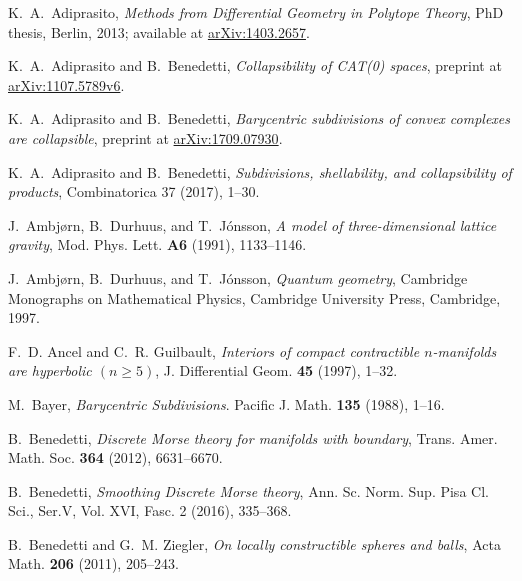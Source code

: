 \documentclass[a4paper,11pt]{article}
\theoremstyle{plain}
\theoremstyle{definition}
\begin{document}
{\small
\begin{thebibliography}{AL{\L}M13}

K.~A.~Adiprasito, \emph{Methods from Differential Geometry in Polytope Theory}, PhD thesis, Berlin, 2013; available at 
\url{arXiv:1403.2657}.

K.~A.~Adiprasito and B.~Benedetti, \emph{Collapsibility of CAT(0) spaces}, preprint at \url{arXiv:1107.5789v6}.

K.~A.~Adiprasito and B.~Benedetti, \emph{Barycentric subdivisions of convex complexes are collapsible}, preprint at \url{arXiv:1709.07930}.

K.~A.~Adiprasito and B.~Benedetti, \emph{Subdivisions, shellability, and collapsibility of products}, Combinatorica 37 (2017), 1--30.


J.~Ambj{\o}rn, B.~Durhuus, and T.~J{\'o}nsson, \emph{A model of three-dimensional lattice gravity},
Mod. Phys. Lett.  \textbf{A6} (1991), 1133--1146.

J.~Ambj{\o}rn, B.~Durhuus, and T.~J{\'o}nsson, \emph{Quantum geometry},
  Cambridge Monographs on Mathematical Physics, Cambridge University Press,
  Cambridge, 1997.


F.~D. Ancel and C.~R. Guilbault, \emph{Interiors of compact contractible {$n$}-manifolds are hyperbolic
  {$(n\geq 5)$}}, J. Differential Geom. \textbf{45} (1997), 1--32.


M.~Bayer, \emph{Barycentric Subdivisions}. Pacific J. Math. \textbf{135} (1988), 1--16.



B.~Benedetti, \emph{Discrete {M}orse theory for manifolds with boundary},
  Trans. Amer. Math. Soc. \textbf{364} (2012), 6631--6670.

B.~Benedetti, \emph{Smoothing Discrete {M}orse theory},
  Ann. Sc. Norm. Sup. Pisa Cl. Sci., Ser.V, Vol. XVI, Fasc. 2 (2016), 335--368.

B.~Benedetti and G.~M. Ziegler, \emph{On locally constructible spheres and
  balls}, Acta Math. \textbf{206} (2011), 205--243.



\end{thebibliography}}
\end{document}
